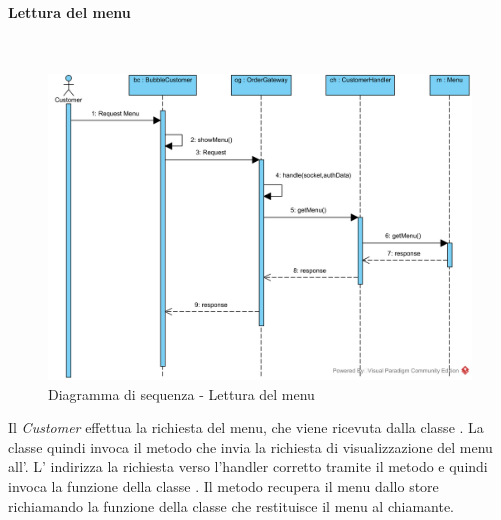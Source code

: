 \paragraph{Lettura del menu}\mbox{} \\
\nopagebreak
\begin{figure}[H]
	\centering
	\includegraphics[width=15cm]{./diagrammi/sequenza/letturadelmenu.png}
	\caption{Diagramma di sequenza - Lettura del menu}
\end{figure}
Il \textit{Customer} effettua la richiesta del menu, che viene ricevuta dalla classe . La classe quindi invoca il metodo  che invia la richiesta di visualizzazione del menu all'. L' indirizza la richiesta verso l'handler corretto tramite il metodo  e quindi invoca la funzione  della classe . Il metodo recupera il menu dallo store richiamando la funzione  della classe  che restituisce il menu al chiamante.  

\clearpage
{}

